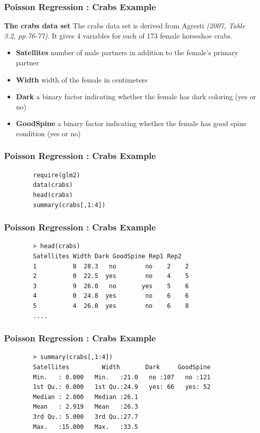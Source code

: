 \documentclass[MASTER.tex]{subfiles}
\begin{document}
\begin{frame}[fragile]
	\frametitle{Poisson Regression :  Crabs Example}
	\textbf{The crabs data set}
	The crabs data set is derived from Agresti \textit{(2007, Table 3.2, pp.76-77)}. It gives 4 variables for each of 173 female horseshoe crabs.
	\begin{itemize}
		\item \textbf{Satellites}
		number of male partners in addition to the female's primary partner
		
		\item \textbf{Width}
		width of the female in centimeters
		
		\item \textbf{Dark}
		a binary factor indicating whether the female has dark coloring (yes or no)
		
		\item \textbf{GoodSpine}
		a binary factor indicating whether the female has good spine condition (yes or no)
	\end{itemize}
\end{frame}
\begin{frame}[fragile]
	\frametitle{Poisson Regression :  Crabs Example}
	\begin{framed}
		\begin{verbatim}
		require(glm2)
		data(crabs)
		head(crabs)
		summary(crabs[,1:4])
		\end{verbatim}
		\end{framed}
	\end{frame}
	\begin{frame}[fragile]
		\frametitle{Poisson Regression :  Crabs Example}
		\begin{verbatim}
		> head(crabs)
		Satellites Width Dark GoodSpine Rep1 Rep2
		1          8  28.3   no        no    2    2
		2          0  22.5  yes        no    4    5
		3          9  26.0   no       yes    5    6
		4          0  24.8  yes        no    6    6
		5          4  26.0  yes        no    6    8
		....
		\end{verbatim}
	\end{frame}
	\begin{frame}[fragile]
		\frametitle{Poisson Regression :  Crabs Example}
		\begin{verbatim}
		> summary(crabs[,1:4])
		Satellites         Width       Dark     GoodSpine
		Min.   : 0.000   Min.   :21.0   no :107   no :121  
		1st Qu.: 0.000   1st Qu.:24.9   yes: 66   yes: 52  
		Median : 2.000   Median :26.1                      
		Mean   : 2.919   Mean   :26.3                      
		3rd Qu.: 5.000   3rd Qu.:27.7                      
		Max.   :15.000   Max.   :33.5                
		
		\end{verbatim}
	\end{frame}
\end{document}

